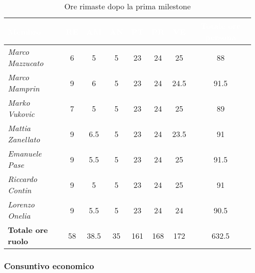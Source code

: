 \begin{table}[H]
    \renewcommand\arraystretch{1.5}
    \centering
    \begin{tabular}{|l|c|c|c|c|c|c|c|}
    \hline
    \rowcolor[HTML]{036400}
    \textcolor{white}{\textbf{Membro}} & \multicolumn{1}{c|}{\textcolor{white}{\textbf{RE}}} & \multicolumn{1}{c|}{\textcolor{white}{\textbf{AM}}} & \multicolumn{1}{c|}{\textcolor{white}{\textbf{AN}}} & \multicolumn{1}{c|}{\textcolor{white}{\textbf{PT}}} & \multicolumn{1}{c|}{\textcolor{white}{\textbf{PR}}} & \multicolumn{1}{c|}{\textcolor{white}{\textbf{VE}}} & \multicolumn{1}{c|}{\textcolor{white}{\textbf{Totale ore persona}}} \\ \hline
    \rowcolor[HTML]{EFEFEF}\textit{Marco Mazzucato}  & 6  & 5   & 5  & 23  & 24 & 25   & 88   \\ \hline
    \rowcolor[HTML]{C0C0C0}\textit{Marco Mamprin}    & 9  & 6   & 5  & 23  & 24 & 24.5 & 91.5 \\ \hline
    \rowcolor[HTML]{EFEFEF}\textit{Marko Vukovic}    & 7  & 5   & 5  & 23  & 24 & 25   & 89   \\ \hline
    \rowcolor[HTML]{C0C0C0}\textit{Mattia Zanellato} & 9  & 6.5 & 5  & 23  & 24 & 23.5 & 91   \\ \hline
    \rowcolor[HTML]{EFEFEF}\textit{Emanuele Pase}    & 9  & 5.5 & 5  & 23  & 24 & 25   & 91.5 \\ \hline
    \rowcolor[HTML]{C0C0C0}\textit{Riccardo Contin}  & 9  & 5   & 5  & 23  & 24 & 25   & 91   \\ \hline
    \rowcolor[HTML]{EFEFEF}\textit{Lorenzo Onelia}   & 9  & 5.5 & 5  & 23  & 24 & 24   & 90.5 \\ \hline
    \textbf{Totale ore ruolo} & 58 & 38.5& 35 & 161 & 168& 172  & 632.5\\ \hline
    \end{tabular}
    \caption{Ore rimaste dopo la prima milestone}
\end{table}

\subsubsection{Consuntivo economico}

